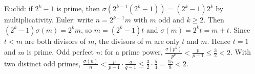 \documentclass[11pt,a4paper]{article}
\begin{document}
 Euclid: if $2^k-1$ is prime, then $\sigma(2^{k-1}(2^k-1))=(2^k-1)2^k$ by multiplicativity.
 Euler: write $n=2^{k-1}m$ with $m$ odd and $k\ge2$. Then $(2^k-1)\sigma(m)=2^km$, so $m=(2^k-1)t$ and $\sigma(m)=2^kt=m+t$. Since $t<m$ are both divisors of $m$, the divisors of $m$ are only $t$ and $m$. Hence $t=1$ and $m$ is prime.
 Odd perfect $n$: for a prime power, $\frac{\sigma(p^k)}{p^k}<\frac p{p-1}\le\frac32<2$. With two distinct odd primes, $\frac{\sigma(n)}n<\frac p{p-1}\cdot\frac q{q-1}\le\frac32\cdot\frac54=\frac{15}8<2$.
\end{document}
